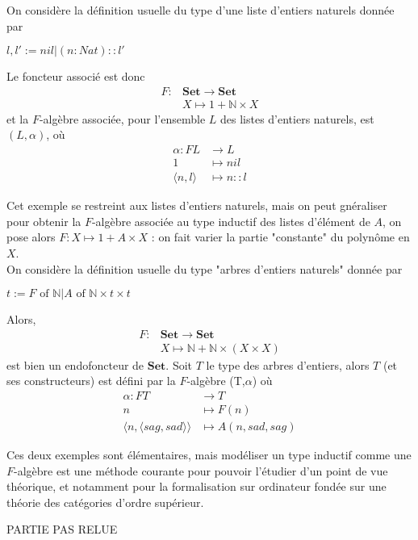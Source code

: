 \documentclass{article}
\newcommand{\N}{\mathbb{N}}
\begin{document}
On considère la définition usuelle du type d'une liste d'entiers naturels donnée par 
\begin{center}
$l,l' := nil | (n : Nat) :: l'$    
\end{center}
Le foncteur associé est donc
\begin{align*}
F : & \mathbf{Set} \rightarrow \mathbf{Set} \\
& X \mapsto 1 + \N \times X
\end{align*}
et la $F$-algèbre associée, pour l'ensemble $L$ des listes d'entiers naturels, est $(L,\alpha)$, où
\begin{align*}
\alpha :  FL &  \rightarrow L \\
          1 & \mapsto nil  \\ 
          \langle n, l \rangle & \mapsto n :: l
\end{align*}

Cet exemple se restreint aux listes d'entiers naturels, mais on peut gnéraliser pour obtenir la $F$-algèbre associée au type inductif des listes d'élément de $A$, on pose alors $F : X \mapsto 1 + A \times X$ : on fait varier la partie "constante" du polynôme en $X$. 
\\ 
On considère la définition usuelle du type "arbres d'entiers naturels" donnée par 
\begin{center}
    $t := F \text{ of }  \N |  A \text{ of } \N \times t \times t$
\end{center}
Alors, 
\begin{align*}
F : & \mathbf{Set} \rightarrow \mathbf{Set} \\       
    & X \mapsto \N + \N \times (X \times X)
\end{align*}
est bien un endofoncteur de $\mathbf{Set}$.
Soit $T$ le type des arbres d'entiers, alors $T$  (et ses constructeurs) est défini par la $F$-algèbre  (T,$\alpha$) où 
\begin{align*}
\alpha :  FT &  \rightarrow T \\
            n & \mapsto F(n)  \\ 
      \langle n, \langle sag, sad \rangle \rangle &\mapsto A (n, sad, sag)
\end{align*}

Ces deux exemples sont élémentaires, mais modéliser un type inductif comme une $F$-algèbre est une méthode courante pour pouvoir l'étudier d'un point de vue théorique, et notamment pour la formalisation sur ordinateur fondée sur une théorie des catégories d'ordre supérieur.

PARTIE PAS RELUE
\end{document}
